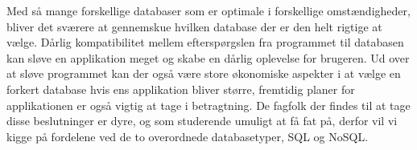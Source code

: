 Med så mange forskellige databaser som er optimale i forskellige omstændigheder, bliver det sværere at gennemskue hvilken database der er den helt rigtige at vælge. Dårlig kompatibilitet mellem efterspørgslen fra programmet til databasen kan sløve en applikation meget og skabe en dårlig oplevelse for brugeren. Ud over at sløve programmet kan der også være store økonomiske aspekter i at vælge en forkert database hvis ens applikation bliver større, fremtidig planer for applikationen er også vigtig at tage i betragtning. De fagfolk der findes til at tage disse beslutninger er dyre, og som studerende umuligt at få fat på, derfor vil vi kigge på fordelene ved de to overordnede databasetyper, SQL og NoSQL.
